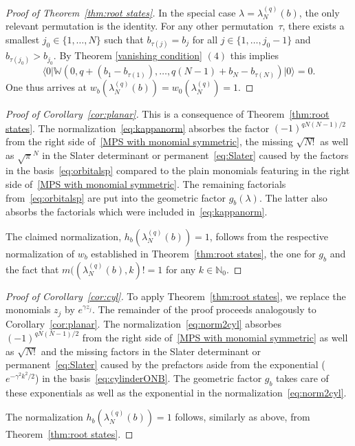 \documentclass[letterpaper, DIV=17]{scrartcl}
\numberwithin{equation}{section}
\theoremstyle{definition}
\begin{document}
\begin{proof}[Proof of Theorem~\ref{thm:root states}]
In the special case $ \lambda =  \lambda^{(q)}_N(b) $, the only relevant permutation is the identity. For any other permutation~$\tau$, there exists a smallest $j_0\in \{ 1, \dots, N\}$ such that $b_{\tau(j)}=b_j$ for all $j\in \{1, \dots, j_0-1\}$ and $b_{\tau(j_0)}> b_{j_0}$. By Theorem \ref{vanishing condition} $(4)$ this implies
	$$ \langle 0 \vert \mathbb{W}(0, q + (b_1-b_{\tau(1)}), \dots, q(N-1)+b_N-b_{\tau(N)}) \vert 0\rangle =0. $$  One thus arrives at $ w_b( \lambda^{(q)}_N(b) ) = w_0( \lambda^{(q)}_N ) = 1 $. 
 \end{proof}
 
 
 
 \begin{proof}[Proof of Corollary~\ref{cor:planar}]
 This is a consequence of  Theorem~\ref{thm:root states}. 
 The normalization~\eqref{eq:kappanorm} absorbes the factor $(-1)^{qN(N-1)/2}$ from the right side of~\eqref{MPS with monomial symmetric}, the missing $ \sqrt{N!} $ as well as $ \sqrt{\pi}^N  $ in the Slater determinant or permanent~\eqref{eq:Slater} caused by the factors in the basis~\eqref{eq:orbitalsp} compared to the plain monomials featuring in the right side of~\eqref{MPS with monomial symmetric}. The remaining factorials from~\eqref{eq:orbitalsp} are put into the geometric factor $ g_b(\lambda) $. The latter also absorbs the factorials which were included in~\eqref{eq:kappanorm}. 
 
 The claimed normalization, $ h_b(\lambda^{(q)}_N(b) ) = 1  $, follows from the respective normalization of $ w_b $ established in Theorem~\ref{thm:root states}, the one for $ g_b $ and the fact that $ m((\lambda^{(q)}_N(b) , k ) != 1 $ for any $ k\in \mathbb{N}_0 $. 
  \end{proof}
  
 \begin{proof}[Proof of Corollary~\ref{cor:cyl}] To apply Theorem~\ref{thm:root states}, we replace the monomials $ z_j $ by $ e^{\gamma z_j} $. The remainder of the proof proceeds analogously to  Corollary~\ref{cor:planar}. The normalization~\eqref{eq:norm2cyl} absorbes $(-1)^{qN(N-1)/2}$ from the right side of~\eqref{MPS with monomial symmetric} as well as $ \sqrt{N!} $ and the missing factors in the Slater determinant or permanent~\eqref{eq:Slater} caused by the prefactors aside from the exponential ($  e^{- \gamma^2 k^2/2}  $) in the basis~\eqref{eq:cylinderONB}. The geometric factor $ g_b $ takes care of these exponentials as well as the exponential in the normalization~\eqref{eq:norm2cyl}.
 
The normalization  $ h_b(\lambda^{(q)}_N(b) ) = 1  $ follows, similarly as above, from Theorem~\ref{thm:root states}. 
 \end{proof}
\end{document}
